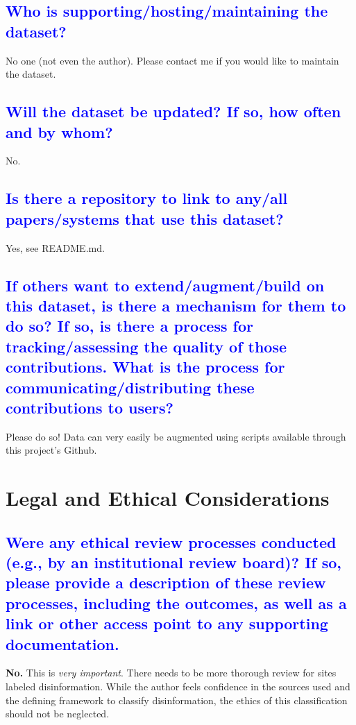 \documentclass[letterpaper, 10 pt, conference]{ieeeconf}  %
\begin{document}
{{\textcolor{blue}{\subsection{Who is supporting/hosting/maintaining the
dataset?}}
No one (not even the author). Please contact me if you would like to maintain the dataset.

\textcolor{blue}{\subsection{Will the dataset be updated? If so, how often and
by whom?}}
No.

\textcolor{blue}{\subsection{Is there a repository to link to any/all papers/systems that use this dataset?}}
Yes, see README.md.

\textcolor{blue}{\subsection{If others want to extend/augment/build on this
dataset, is there a mechanism for them to do so?
If so, is there a process for tracking/assessing the
quality of those contributions. What is the process
for communicating/distributing these contributions
to users?}}
Please do so! Data can very easily be augmented using scripts available through this project's Github.

\section{Legal and Ethical Considerations}

\textcolor{blue}{\subsection{Were any ethical review processes conducted (e.g., by an institutional review board)? If so, please provide a description of these review
processes, including the outcomes, as well as a link or other access point
to any supporting documentation.}}
\textbf{No.} This is \textit{very important}. There needs to be more thorough review for sites labeled disinformation. While the author feels confidence in the sources used and the defining framework to classify disinformation, the ethics of this classification should not be neglected.

}}
\end{document}
